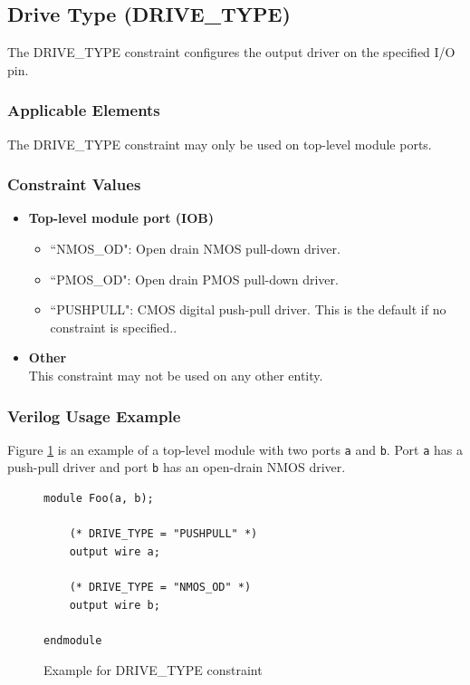\documentclass{article}
\begin{document}

\pagebreak
\subsection{Drive Type (DRIVE\_TYPE)}

The DRIVE\_TYPE constraint configures the output driver on the specified I/O pin.

\subsubsection{Applicable Elements}
The DRIVE\_TYPE constraint may only be used on top-level module ports. 

\subsubsection{Constraint Values}
\begin{itemize}
\item {\bfseries Top-level module port (IOB)}
	\begin{itemize}
		\item ``NMOS\_OD": Open drain NMOS pull-down driver.
		\item ``PMOS\_OD": Open drain PMOS pull-down driver.
		\item ``PUSHPULL": CMOS digital push-pull driver. This is the default if no constraint is specified..
	\end{itemize}
\item {\bfseries Other} \\
This constraint may not be used on any other entity.
\end{itemize}

\subsubsection{Verilog Usage Example}

Figure \ref{constraint-drivetype} is an example of a top-level module with two ports \texttt{a} and \texttt{b}. Port 
\texttt{a} has a push-pull driver and port \texttt{b} has an open-drain NMOS driver.

\begin{figure}[h]
\begin{lstlisting}
module Foo(a, b);

	(* DRIVE_TYPE = "PUSHPULL" *)
	output wire a;

	(* DRIVE_TYPE = "NMOS_OD" *)
	output wire b;
	
endmodule
\end{lstlisting}
\caption{Example for DRIVE\_TYPE constraint}
\label{constraint-drivetype}
\end{figure}
\end{document}
